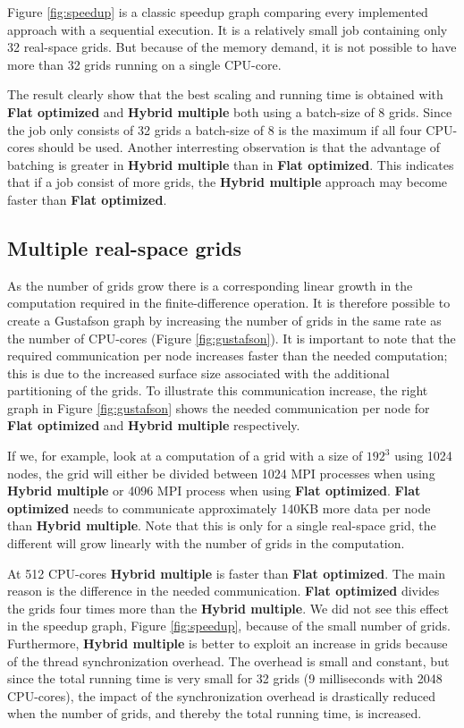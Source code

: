 \documentclass[conference]{IEEEtran}
\begin{document}
Figure \ref{fig:speedup} is a classic speedup graph comparing every implemented approach with a sequential execution. It is a relatively small job containing only 32 real-space grids. But because of the memory demand, it is not possible to have more than 32 grids running on a single CPU-core.

The result clearly show that the best scaling and running time is obtained with \textbf{Flat optimized} and \textbf{Hybrid multiple} both using a batch-size of 8 grids. Since the job only consists of 32 grids a batch-size of 8 is the maximum if all four CPU-cores should be used. Another interresting observation is that the advantage of batching is greater in \textbf{Hybrid multiple} than in \textbf{Flat optimized}. This indicates that if a job consist of more grids, the \textbf{Hybrid multiple} approach may become faster than \textbf{Flat optimized}.


\subsection{Multiple real-space grids}
As the number of grids grow there is a corresponding linear growth in the computation required in the finite-difference operation. It is therefore possible to create a Gustafson graph by increasing the number of grids in the same rate as the number of CPU-cores (Figure \ref{fig:gustafson}). It is important to note that the required communication per node increases faster than the needed computation; this is due to the increased surface size associated with the additional partitioning of the grids. To illustrate this communication increase, the right graph in Figure \ref{fig:gustafson} shows the needed communication per node for \textbf{Flat optimized} and \textbf{Hybrid multiple} respectively.

If we, for example, look at a computation of a grid with a size of $192^3$ using 1024 nodes, the grid will either be divided between 1024 MPI processes when using \textbf{Hybrid multiple} or 4096 MPI process when using \textbf{Flat optimized}. \textbf{Flat optimized} needs to communicate approximately 140KB more data per node than \textbf{Hybrid multiple}. Note that this is only for a single real-space grid, the different will grow linearly with the number of grids in the computation.

At 512 CPU-cores \textbf{Hybrid multiple} is faster than \textbf{Flat optimized}. The main reason is the difference in the needed communication. \textbf{Flat optimized} divides the grids four times more than the \textbf{Hybrid multiple}. We did not see this effect in the speedup graph, Figure \ref{fig:speedup}, because of the small number of grids. Furthermore, \textbf{Hybrid multiple} is better to exploit an increase in grids because of the thread synchronization overhead. The overhead is small and constant, but since the total running time is very small for 32 grids (9 milliseconds with 2048 CPU-cores), the impact of the synchronization overhead is drastically reduced when the number of grids, and thereby the total running time, is increased.
\end{document}
